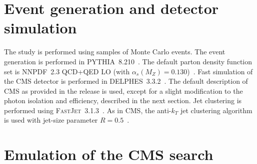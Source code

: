 \section{Event generation and detector simulation}
\label{sec:gensim}
The study is performed using samples of Monte Carlo events. The event generation is performed in \textsc{PYTHIA}~8.210~\cite{Pythia64,Pythia82}.
The default parton density function set is \textsc{NNPDF}~2.3 QCD+QED
LO (with $\alpha_s(M_Z) =
0.130$)~\cite{NNPDF1,NNPDF2,NNPDF3}. Fast simulation of the CMS
detector is performed in \textsc{DELPHES}~3.3.2~\cite{Delphes3}. The
default description of CMS as provided in the release is used, except
for a slight modification to the photon isolation and efficiency,
described in the next section. Jet clustering is performed using
\textsc{FastJet}~3.1.3~\cite{fastjet}. As in CMS, the anti-$k_T$ jet
clustering algorithm is used with jet-size parameter $R=0.5$~\cite{antikt}.

\section{Emulation of the CMS search}
\label{sec:analysis}

